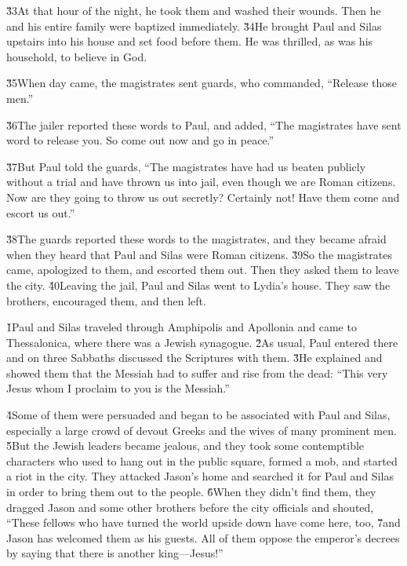 \v{33}At that hour of the night, he took them and washed their wounds. Then he and his entire family were baptized immediately. \v{34}He brought Paul and Silas upstairs into his house and set food before them. He was thrilled, as was his household, to believe in God.

\v{35}When day came, the magistrates sent guards, who commanded, ``Release those men.''

\v{36}The jailer reported these words to Paul, and added, ``The magistrates have sent word to release you. So come out now and go in peace.''

\v{37}But Paul told the guards, ``The magistrates have had us beaten publicly without a trial and have thrown us into jail, even though we are Roman citizens. Now are they going to throw us out secretly? Certainly not! Have them come and escort us out.''

\v{38}The guards reported these words to the magistrates, and they became afraid when they heard that Paul and Silas were Roman citizens. \v{39}So the magistrates came, apologized to them, and escorted them out. Then they asked them to leave the city. \v{40}Leaving the jail, Paul and Silas went to Lydia's house. They saw the brothers, encouraged them, and then left.

\v{1}Paul and Silas traveled through Amphipolis and Apollonia and came to Thessalonica, where there was a Jewish synagogue. \v{2}As usual, Paul entered there and on three Sabbaths discussed the Scriptures with them. \v{3}He explained and showed them that the Messiah had to suffer and rise from the dead: ``This very Jesus whom I proclaim to you is the Messiah.''

\v{4}Some of them were persuaded and began to be associated with Paul and Silas, especially a large crowd of devout Greeks and the wives of many prominent men. \v{5}But the Jewish leaders became jealous, and they took some contemptible characters who used to hang out in the public square, formed a mob, and started a riot in the city. They attacked Jason's home and searched it for Paul and Silas in order to bring them out to the people. \v{6}When they didn't find them, they dragged Jason and some other brothers before the city officials and shouted, ``These fellows who have turned the world upside down have come here, too, \v{7}and Jason has welcomed them as his guests. All of them oppose the emperor's decrees by saying that there is another king---Jesus!''

